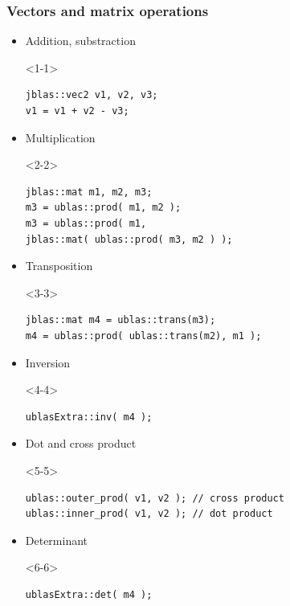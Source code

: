\documentclass[compress]{beamer}
\begin{document}
\begin{frame}[fragile]
  \frametitle{Vectors and matrix operations}
  \begin{itemize}
   \item<1-> Addition, substraction
    \begin{onlyenv}<1-1>
      \begin{lstlisting}
jblas::vec2 v1, v2, v3;
v1 = v1 + v2 - v3;
      \end{lstlisting}
    \end{onlyenv}
   \item<2-> Multiplication
    \begin{onlyenv}<2-2>
      \begin{lstlisting}
jblas::mat m1, m2, m3;
m3 = ublas::prod( m1, m2 );
m3 = ublas::prod( m1,
jblas::mat( ublas::prod( m3, m2 ) );
      \end{lstlisting}
    \end{onlyenv}
    \item<3-> Transposition
    \begin{onlyenv}<3-3>
      \begin{lstlisting}
jblas::mat m4 = ublas::trans(m3);
m4 = ublas::prod( ublas::trans(m2), m1 );
      \end{lstlisting}
    \end{onlyenv}
    \item<4-> Inversion
    \begin{onlyenv}<4-4>
      \begin{lstlisting}
ublasExtra::inv( m4 );
      \end{lstlisting}
    \end{onlyenv}
    \item<5-> Dot and cross product
    \begin{onlyenv}<5-5>
      \begin{lstlisting}
ublas::outer_prod( v1, v2 ); // cross product
ublas::inner_prod( v1, v2 ); // dot product
      \end{lstlisting}
    \end{onlyenv}
    \item<6-> Determinant
    \begin{onlyenv}<6-6>
      \begin{lstlisting}
ublasExtra::det( m4 );
      \end{lstlisting}
    \end{onlyenv}
  \end{itemize}
\end{frame}
\end{document}
